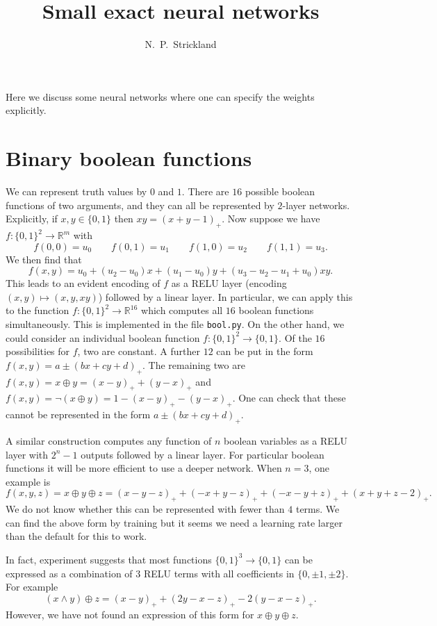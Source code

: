 \documentclass{amsart}
\newcommand{\R}         {{\mathbb{R}}}
\renewcommand{\:}{\colon}
\theoremstyle{definition}
\begin{document}
\title{Small exact neural networks}
\author{N.~P.~Strickland}

\maketitle 


Here we discuss some neural networks where one can specify the weights
explicitly. 

\section{Binary boolean functions}

We can represent truth values by $0$ and $1$.  There are $16$
possible boolean functions of two arguments, and they can all be
represented by $2$-layer networks.  Explicitly, if $x,y\in\{0,1\}$
then $xy=(x+y-1)_+$.  Now suppose we have $f\:\{0,1\}^2\to\R^m$ with 
\[ f(0,0) = u_0 \qquad f(0,1) = u_1 \qquad 
   f(1,0) = u_2 \qquad f(1,1) = u_3.
\]
We then find that 
\[ f(x,y) = u_0 + (u_2-u_0)x + (u_1-u_0)y + (u_3-u_2-u_1+u_0)xy. \]
This leads to an evident encoding of $f$ as a RELU layer (encoding
$(x,y)\mapsto(x,y,xy)$) followed by a linear layer.  In particular, we
can apply this to the function $f\:\{0,1\}^2\to\R^{16}$ which computes
all $16$ boolean functions simultaneously.  This is implemented in the
file \texttt{bool.py}.  On the other hand, we could consider an
individual boolean function $f\:\{0,1\}^2\to\{0,1\}$.  Of the $16$
possibilities for $f$, two are constant.  A further $12$ can be put in
the form $f(x,y)=a\pm(bx+cy+d)_+$.  The remaining two are
$f(x,y)=x\oplus y=(x-y)_++(y-x)_+$ and 
$f(x,y)=\neg(x\oplus y)=1-(x-y)_+-(y-x)_+$.  One can check that these
cannot be represented in the form $a\pm(bx+cy+d)_+$. 

A similar construction computes any function of $n$ boolean variables
as a RELU layer with $2^n-1$ outputs followed by a linear layer.  For
particular boolean functions it will be more efficient to use a deeper
network.  When $n=3$, one example is 
\[ f(x,y,z) =  x\oplus y\oplus z = 
   (x-y-z)_++(-x+y-z)_++(-x-y+z)_++(x+y+z-2)_+.
\]
We do not know whether this can be represented with fewer than $4$
terms.  We can find the above form by training but it seems we need a
learning rate larger than the default for this to work.

In fact, experiment suggests that most functions $\{0,1\}^3\to\{0,1\}$
can be expressed as a combination of $3$ RELU terms with all
coefficients in $\{0,\pm 1,\pm 2\}$.  For example
\[ (x\wedge y)\oplus z = 
    (x-y)_++(2y-x-z)_+-2(y-x-z)_+.
\]
However, we have not found an expression of this form for $x\oplus
y\oplus z$.
\end{document}
